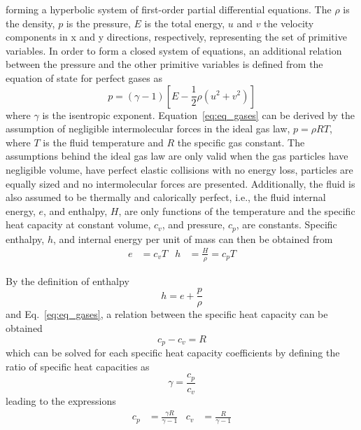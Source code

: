 %
forming a hyperbolic system of first-order partial differential equations. The $\rho$ is the density, $p$ is the pressure, $E$ is the total energy, $u$ and $v$ the velocity components in x and y directions, respectively, representing the set of primitive variables. In order to form a closed system of equations, an additional relation between the pressure and the other primitive variables is defined from the equation of state for perfect gases as
%
\begin{equation}
    \label{eq:eq_gases}
    p = (\gamma-1) \left[ E - \frac{1}{2}\rho(u^2+v^2) \right]
\end{equation}
%
where $\gamma$ is the isentropic exponent.
Equation\ \eqref{eq:eq_gases} can be derived by the assumption of negligible intermolecular forces in the ideal gas law, $p = \rho RT$, where $T$ is the fluid temperature and $R$ the specific gas constant. The assumptions behind the ideal gas law are only valid when the gas particles have negligible volume, have perfect elastic collisions with no energy loss, particles are equally sized and no intermolecular forces are presented. Additionally, the fluid is also assumed to be thermally and calorically perfect, i.e., the fluid internal energy, $e$, and enthalpy, $H$, are only functions of the temperature and the specific heat capacity at constant volume, $c_v$, and pressure, $c_p$, are constants. Specific enthalpy, $h$, and internal energy per unit of mass can then be obtained from
%
\begin{align*}
    \label{eq:eq_tps}
    e &= c_vT  & h &= \frac{H}{\rho} = c_pT
\end{align*}
%

By the definition of enthalpy 
%
\begin{equation}
    \label{eq:eq_enthalpy}
	h = e + \frac{p}{\rho}
\end{equation}
%
and Eq.\ \eqref{eq:eq_gases}, a relation between the specific heat capacity can be obtained
%
\begin{equation}
    \label{eq:eq_heats}
    c_p - c_v = R
\end{equation}
%
which can be solved for each specific heat capacity coefficients by defining the ratio of specific heat capacities as
%
\begin{equation}
    \label{eq:eq_heats2}
    \gamma = \frac{c_p}{c_v}
\end{equation}
%
leading to the expressions
%
\begin{align}
    \label{eq:eq_heats3}
    c_p &= \frac{\gamma R}{\gamma-1}      &     c_v &= \frac{R}{\gamma-1}
\end{align}

